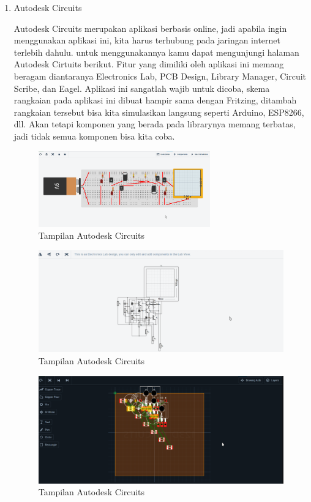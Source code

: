 \begin{enumerate}
    \item Autodesk Circuits
    \par Autodesk Circuits merupakan aplikasi berbasis online, jadi apabila ingin menggunakan aplikasi ini, kita harus terhubung pada jaringan internet terlebih dahulu. untuk menggunakannya kamu dapat mengunjungi halaman Autodesk Cirtuits berikut. Fitur yang dimiliki oleh aplikasi ini memang beragam diantaranya Electronics Lab, PCB Design, Library Manager, Circuit Scribe, dan Eagel. Aplikasi ini sangatlah wajib untuk dicoba, skema rangkaian pada aplikasi ini dibuat hampir sama dengan Fritzing, ditambah rangkaian tersebut bisa kita simulasikan langsung seperti Arduino, ESP8266, dll. Akan tetapi komponen yang berada pada librarynya memang terbatas, jadi tidak semua komponen bisa kita coba.
    \begin{figure}[H]
    \centering
    \includegraphics[width=0.7\textwidth]{figures/desk1.png}
    \caption{Tampilan Autodesk Circuits }
    \label{print}
    \end{figure}
    
     \begin{figure}[H]
    \centering
    \includegraphics[width=1\textwidth]{figures/desk2.png}
    \caption{Tampilan Autodesk Circuits }
    \label{print}
    \end{figure}
    
     \begin{figure}[H]
    \centering
    \includegraphics[width=1\textwidth]{figures/desk3.png}
    \caption{Tampilan Autodesk Circuits }
    \label{print}
    \end{figure}
    

\end{enumerate}
